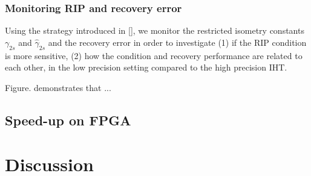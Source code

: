 \documentclass{article}
\begin{document}


\subsubsection{Monitoring RIP and recovery error}
Using the strategy introduced in [], we monitor the restricted isometry constants $\gamma_{2s}$ and $\hat{\gamma}_{2s}$ and the recovery error in order to investigate (1) if the RIP condition is more sensitive, (2) how the condition and recovery performance are related to each other, in the low precision setting compared to the high precision IHT.

Figure. demonstrates that ...






\subsection{Speed-up on FPGA}





\section{Discussion}



\nocite{langley00}



\end{document}
